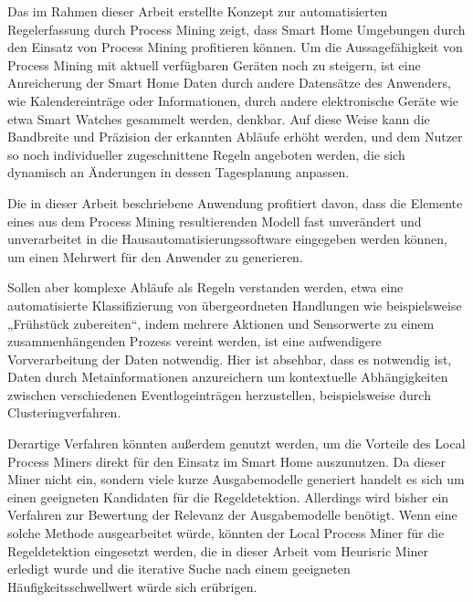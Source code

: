 Das im Rahmen dieser Arbeit erstellte Konzept zur automatisierten Regelerfassung durch Process Mining zeigt, dass Smart Home Umgebungen durch den Einsatz von Process Mining profitieren können.  
Um die Aussagefähigkeit von Process Mining mit aktuell verfügbaren Geräten noch zu steigern, ist eine Anreicherung der  Smart Home Daten durch andere Datensätze des Anwenders, wie Kalendereinträge oder Informationen, durch andere elektronische Geräte wie etwa Smart Watches gesammelt werden, denkbar. Auf diese Weise kann die Bandbreite und Präzision der erkannten Abläufe erhöht werden, und dem Nutzer so noch individueller zugeschnittene Regeln angeboten werden, die sich dynamisch an Änderungen in dessen Tagesplanung anpassen.

Die in dieser Arbeit beschriebene Anwendung profitiert davon, dass die Elemente eines aus dem Process Mining resultierenden Modell fast unverändert und unverarbeitet in die Hausautomatisierungssoftware eingegeben werden können, um einen Mehrwert für den Anwender zu generieren. 

Sollen aber komplexe Abläufe als Regeln verstanden werden, etwa eine automatisierte Klassifizierung von übergeordneten Handlungen wie beispielsweise „Frühstück zubereiten“, indem mehrere Aktionen und Sensorwerte zu einem zusammenhängenden Prozess vereint werden, ist eine aufwendigere Vorverarbeitung der Daten notwendig. Hier ist absehbar, dass es notwendig ist, Daten durch Metainformationen anzureichern um kontextuelle Abhängigkeiten zwischen verschiedenen Eventlogeinträgen herzustellen, beispielsweise durch Clusteringverfahren. 

Derartige Verfahren könnten außerdem genutzt werden, um die Vorteile des Local Process Miners direkt für den Einsatz im Smart Home auszunutzen. Da dieser Miner nicht ein, sondern viele kurze Ausgabemodelle generiert handelt es sich um einen geeigneten Kandidaten für die Regeldetektion. Allerdings wird bisher ein Verfahren zur Bewertung der Relevanz der Ausgabemodelle benötigt. Wenn eine solche Methode ausgearbeitet würde, könnten der Local Process Miner für die Regeldetektion eingesetzt werden, die in dieser Arbeit vom Heurisric Miner erledigt wurde und die iterative Suche nach einem geeigneten Häufigkeitsschwellwert würde sich erübrigen.

